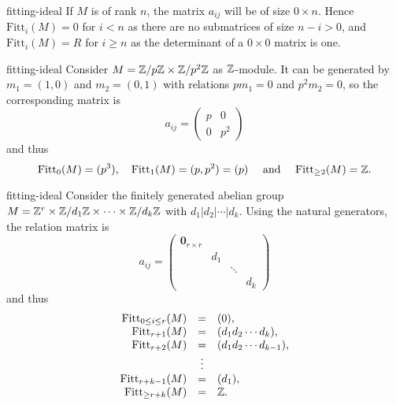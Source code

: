 \begin{example}{fitting-ideal}
    If $M$ is  of rank $n$, the matrix $a_{ij}$ will be of size $0 \times n$. Hence $\text{Fitt}_i(M) = 0$ for $i < n$ as there are no submatrices of size $n - i > 0$, and $\text{Fitt}_i(M) = R$ for $i \ge n$ as the determinant of a $0 \times 0$ matrix is one.
\end{example}

\begin{example}{fitting-ideal}
    Consider $M = \mathbb{Z} / p \mathbb{Z} \times \mathbb{Z} / p^2 \mathbb{Z}$ as $\mathbb{Z}$-module. It can be generated by $m_1 = (1, 0)$ and $m_2 = (0, 1)$ with relations $p m_1 = 0$ and $p^2 m_2 = 0$, so the corresponding matrix is
    \[ a_{ij} = \begin{pmatrix} p & 0 \\ 0 & p^2 \end{pmatrix} \]
    and thus
    \[ \text{Fitt}_0(M) = (p^3), \quad \text{Fitt}_1(M) = (p, p^2) = (p) \quad \text{ and } \quad \text{Fitt}_{\ge 2}(M) = \mathbb{Z} . \]
\end{example}

\begin{example}{fitting-ideal}
    Consider the finitely generated abelian group $M = \mathbb{Z}^r \times \mathbb{Z} / d_1 \mathbb{Z} \times \cdots \times \mathbb{Z} / d_k \mathbb{Z}$ with $d_1 | d_2 | \cdots | d_k$. Using the natural generators, the relation matrix is
    \[ a_{ij} = \begin{pmatrix} \textbf{0}_{r \times r} & & &  \\  & d_1 & \\ & & \ddots & \\ & & & d_k \end{pmatrix} \]
    and thus
    \[ \begin{array}{rcl}
         \text{Fitt}_{0 \le i \le r}(M) &=& (0) , \\
        \text{Fitt}_{r + 1}(M) &=& (d_1 d_2\cdots d_k) , \\
        \text{Fitt}_{r + 2}(M) &=& (d_1 d_2\cdots d_{k - 1}) , \\
        & \vdots & \\
        \text{Fitt}_{r + k - 1}(M) &=& (d_1) , \\
        \text{Fitt}_{\ge r + k}(M) &=& \mathbb{Z} .
    \end{array} \]
\end{example}


